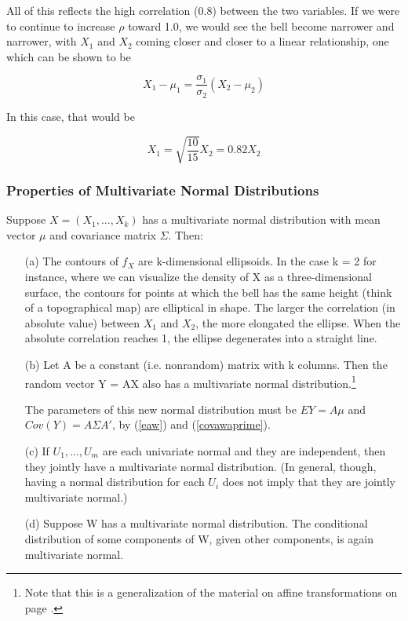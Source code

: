 All of this reflects the high correlation (0.8) between the two variables.
If we were to continue to increase $\rho$ toward 1.0, we would see the
bell become narrower and narrower, with $X_1$ and $X_2$ coming closer
and closer to a linear relationship, one which can be shown to be

\begin{equation}
X_1 - \mu_1 = \frac{\sigma_1}{\sigma_2} (X_2 - \mu_2)
\end{equation}

In this case, that would be

\begin{equation}
X_1 = \sqrt{\frac{10}{15}} X_2 = 0.82 X_2
\end{equation}

\subsubsection{Properties of Multivariate Normal Distributions}
\label{mvnormproperties}

\begin{theorem}
\label{mvnormtheorem}

Suppose $X = (X_1,...,X_k)$ has a multivariate normal distribution with
mean vector $\mu$ and covariance matrix $\Sigma$.  Then:

\begin{itemize}

\item [(a)] The contours of $f_X$ are k-dimensional ellipsoids.  In the
case k = 2 for instance, where we can visualize the density of X as a
three-dimensional surface, the contours for points at which the bell has
the same height (think of a topographical map) are elliptical in shape.
The larger the correlation (in absolute value) between $X_1$ and $X_2$,
the more elongated the ellipse.  When the absolute correlation reaches
1, the ellipse degenerates into a straight line.

\item [(b)] Let A be a constant (i.e. nonrandom) matrix with k columns.
Then the random vector Y = AX also has a multivariate normal
distribution.\footnote{Note that this is a generalization of the
material on affine transformations on page \pageref{affine}.} 

The parameters of this new normal distribution must be $EY = A \mu$ 
and $Cov(Y) = A \Sigma A'$,  by (\ref{eaw}) and (\ref{covawaprime}).
   
\item [(c)] If $U_1,...,U_m$ are each univariate normal and they are
independent, then they jointly have a multivariate normal distribution.
(In general, though, having a normal distribution for each $U_i$ does
not imply that they are jointly multivariate normal.)  

\item [(d)] Suppose W has a multivariate normal distribution.  The
conditional distribution of some components of W, given other
components, is again multivariate normal.

\end{itemize}

\end{theorem}

